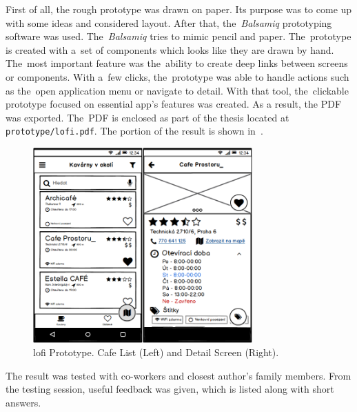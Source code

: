 First of all, the rough prototype was drawn on paper. Its purpose was to come up with some ideas and considered layout. After that, the~\textit{Balsamiq} \cite{balsamiq} prototyping software was used. The~\textit{Balsamiq} tries to mimic pencil and paper. The~prototype is created with a~set of components which looks like they are drawn by hand.
The~most important feature was the~ability to create deep links between screens or components. With a~few clicks, the~prototype was able to handle actions such as the~open application menu or navigate to detail. With that tool, the~clickable prototype focused on essential app's features was created. As a result, the PDF was exported. The~PDF is enclosed as part of the thesis located at \verb|prototype/lofi.pdf|. The portion of the result is shown in~.

\begin{figure}[htp]
    \centering
    \includegraphics[width=0.75\textwidth]{img/analysis/lofi.png}
    \caption{\gls{lofi} Prototype. Cafe List (Left) and Detail Screen (Right).}
    \label{fig:lofi}
\end{figure}

The result was tested with co-workers and closest author's family members. From the testing session, useful feedback was given, which is listed along with short answers. 

